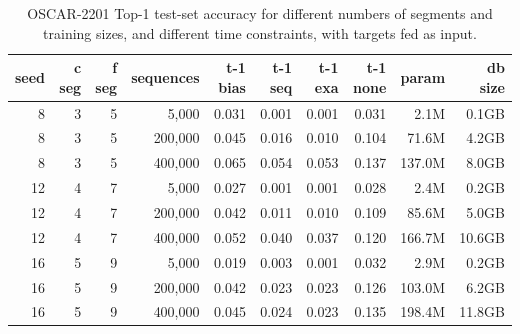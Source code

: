 \begin{table}[H]
\centering
\caption{OSCAR-2201 Top-1 test-set accuracy for different numbers of segments and training sizes, and different time constraints, with targets fed as input.}
\label{tab:oscar-test-top1-accuracy}
\begin{tabular}{rrrrrrrrrr}
\toprule
\textbf{seed} & \textbf{c seg} & \textbf{f seg} & \textbf{sequences} & \textbf{t-1 bias} & \textbf{t-1 seq} & \textbf{t-1 exa} & \textbf{t-1 none} & \textbf{param} & \textbf{db size} \\
\midrule
8 & 3 & 5 & 5,000   & 0.031 & 0.001 & 0.001 & 0.031 & 2.1M & 0.1GB \\
8 & 3 & 5 & 200,000 & 0.045 & 0.016 & 0.010 & 0.104 & 71.6M & 4.2GB \\
8 & 3 & 5 & 400,000 & 0.065 & 0.054 & 0.053 & 0.137 & 137.0M & 8.0GB \\
12 & 4 & 7 & 5,000   & 0.027 & 0.001 & 0.001 & 0.028 & 2.4M & 0.2GB \\
12 & 4 & 7 & 200,000 & 0.042 & 0.011 & 0.010 & 0.109 & 85.6M & 5.0GB \\
12 & 4 & 7 & 400,000 & 0.052 & 0.040 & 0.037 & 0.120 & 166.7M & 10.6GB \\
16 & 5 & 9 & 5,000   & 0.019 & 0.003 & 0.001 & 0.032 & 2.9M & 0.2GB \\
16 & 5 & 9 & 200,000 & 0.042 & 0.023 & 0.023 & 0.126 & 103.0M & 6.2GB \\
16 & 5 & 9 & 400,000 & 0.045 & 0.024 & 0.023 & 0.135 & 198.4M & 11.8GB \\
\bottomrule
\end{tabular}
\end{table}

